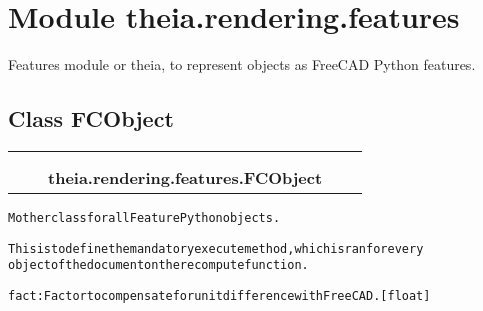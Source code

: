 %
%
%


\section{Module theia.rendering.features}

    \label{theia:rendering:features}
Features module or theia, to represent objects as FreeCAD Python features.



\subsection{Class FCObject}

    \label{theia:rendering:features:FCObject}
\begin{tabular}{cccccc}
\multicolumn{2}{r}{\settowidth{\BCL}{object}\multirow{2}{\BCL}{object}}
&&
  \\\cline{3-3}
  &&\multicolumn{1}{c|}{}
&&
  \\
&&\multicolumn{2}{l}{\textbf{theia.rendering.features.FCObject}}
\end{tabular}

\begin{alltt}
Mother class for all FeaturePython objects.

This is to define the mandatory execute method, which is ran for every
    object of the document on the recompute function.

fact: Factor to compensate for unit difference with FreeCAD. [float]
\end{alltt}



